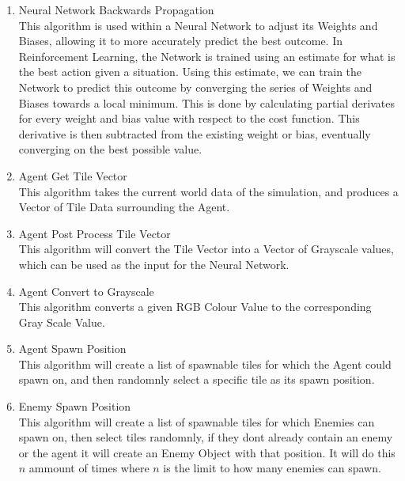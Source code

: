 \begin{flushleft}
\begin{enumerate}
\begin{enumerate}[label=\arabic*)]
                
                \vspace{0.5cm}
                \item Neural Network Backwards Propagation \\
                This algorithm is used within a Neural Network to adjust its Weights and Biases, allowing it to more accurately predict the
                best outcome. In Reinforcement Learning, the Network is trained using an estimate for what is the best action given a situation.
                Using this estimate, we can train the Network to predict this outcome by converging the series of Weights and Biases towards a
                local minimum. This is done by calculating partial derivates for every weight and bias value with respect to the cost function.
                This derivative is then subtracted from the existing weight or bias, eventually converging on the best possible value.

                \vspace{0.5cm}
                \item Agent Get Tile Vector \\
                This algorithm takes the current world data of the simulation, and produces a Vector of Tile Data surrounding the Agent. 
                
                \vspace{0.5cm}
                \item Agent Post Process Tile Vector \\
                This algorithm will convert the Tile Vector into a Vector of Grayscale values, which can be used as the input for the Neural
                Network.
                
                \vspace{0.5cm}
                \item Agent Convert to Grayscale \\
                This algorithm converts a given RGB Colour Value to the corresponding Gray Scale Value.

                \vspace{0.5cm}
                \item Agent Spawn Position \\
                This algorithm will create a list of spawnable tiles for which the Agent could spawn on, and then randomnly select a specific
                tile as its spawn position.
                
                \vspace{0.5cm}
                \item Enemy Spawn Position \\
                This algorithm will create a list of spawnable tiles for which Enemies can spawn on, then select tiles randomnly, if they dont
                already contain an enemy or the agent it will create an Enemy Object with that position. It will do this $n$ ammount of times where $n$ is
                the limit to how many enemies can spawn.
                

\end{enumerate}
\end{enumerate}
\end{flushleft}
